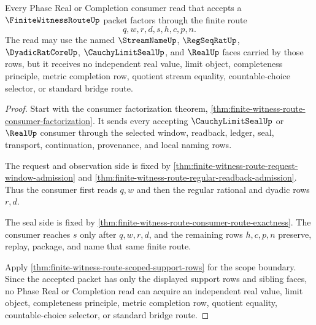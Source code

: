 \begin{theorem}
\label{thm:finite-witness-route-real-completion-scope}
Every Phase Real or Completion consumer read that accepts a $\FiniteWitnessRouteUp$ packet factors through the finite route
$$
q,w,r,d,s,h,c,p,n.
$$
The read may use the named $\StreamNameUp$, $\RegSeqRatUp$, $\DyadicRatCoreUp$, $\CauchyLimitSealUp$, and $\RealUp$ faces carried by those rows, but it receives no independent real value, limit object, completeness principle, metric completion row, quotient stream equality, countable-choice selector, or standard bridge route.
\end{theorem}
\begin{proof}
Start with the consumer factorization theorem, \autoref{thm:finite-witness-route-consumer-factorization}. It sends every accepting $\CauchyLimitSealUp$ or $\RealUp$ consumer through the selected window, readback, ledger, seal, transport, continuation, provenance, and local naming rows.

The request and observation side is fixed by \autoref{thm:finite-witness-route-request-window-admission} and \autoref{thm:finite-witness-route-regular-readback-admission}. Thus the consumer first reads $q,w$ and then the regular rational and dyadic rows $r,d$.

The seal side is fixed by \autoref{thm:finite-witness-route-consumer-route-exactness}. The consumer reaches $s$ only after $q,w,r,d$, and the remaining rows $h,c,p,n$ preserve, replay, package, and name that same finite route.

Apply \autoref{thm:finite-witness-route-scoped-support-rows} for the scope boundary. Since the accepted packet has only the displayed support rows and sibling faces, no Phase Real or Completion read can acquire an independent real value, limit object, completeness principle, metric completion row, quotient equality, countable-choice selector, or standard bridge route.
\end{proof}

